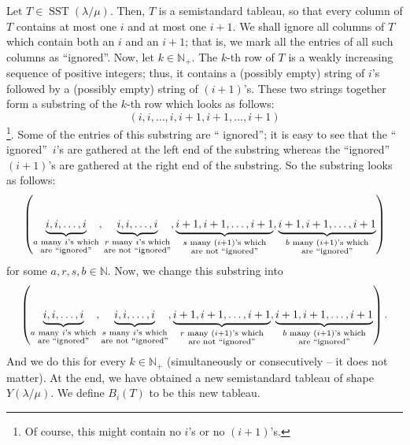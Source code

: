\documentclass[numbers=enddot,12pt,final,onecolumn,notitlepage]{scrartcl}%
\theoremstyle{definition}
\begin{document}
Let $T\in\operatorname*{SST}\left(  \lambda/\mu\right)  $. Then, $T$ is a
semistandard tableau, so that every column of $T$ contains at most one $i$ and
at most one $i+1$. We shall ignore all columns of $T$ which contain both an
$i$ and an $i+1$; that is, we mark all the entries of all such columns as
\textquotedblleft ignored\textquotedblright. Now, let $k\in\mathbb{N}_{+}$.
The $k$-th row of $T$ is a weakly increasing sequence of positive integers;
thus, it contains a (possibly empty) string of $i$'s followed by a (possibly
empty) string of $\left(  i+1\right)  $'s. These two strings together form a
substring of the $k$-th row which looks as follows:%
\[
\left(  i,i,\ldots,i,i+1,i+1,\ldots,i+1\right)
\]
\footnote{Of course, this might contain no $i$'s or no $\left(  i+1\right)
$'s.}. Some of the entries of this substring are \textquotedblleft
ignored\textquotedblright; it is easy to see that the \textquotedblleft
ignored\textquotedblright\ $i$'s are gathered at the left end of the substring
whereas the \textquotedblleft ignored\textquotedblright\ $\left(  i+1\right)
$'s are gathered at the right end of the substring. So the substring looks
as follows:
\[
\left(  \underbrace{i,i,\ldots,i}_{\substack{a\text{ many }i\text{'s
which}\\\text{are \textquotedblleft ignored\textquotedblright}}%
},\underbrace{i,i,\ldots,i}_{\substack{r\text{ many }i\text{'s which}%
\\\text{are not \textquotedblleft ignored\textquotedblright}}%
},\underbrace{i+1,i+1,\ldots,i+1}_{\substack{s\text{ many }\left(  i+1\right)
\text{'s which}\\\text{are not \textquotedblleft ignored\textquotedblright}%
}},\underbrace{i+1,i+1,\ldots,i+1}_{\substack{b\text{ many }\left(
i+1\right)  \text{'s which}\\\text{are \textquotedblleft
ignored\textquotedblright}}}\right)
\]
for some $a,r,s,b\in\mathbb{N}$. Now, we change this substring into%
\[
\left(  \underbrace{i,i,\ldots,i}_{\substack{a\text{ many }i\text{'s
which}\\\text{are \textquotedblleft ignored\textquotedblright}}%
},\underbrace{i,i,\ldots,i}_{\substack{s\text{ many }i\text{'s which}%
\\\text{are not \textquotedblleft ignored\textquotedblright}}%
},\underbrace{i+1,i+1,\ldots,i+1}_{\substack{r\text{ many }\left(  i+1\right)
\text{'s which}\\\text{are not \textquotedblleft ignored\textquotedblright}%
}},\underbrace{i+1,i+1,\ldots,i+1}_{\substack{b\text{ many }\left(
i+1\right)  \text{'s which}\\\text{are \textquotedblleft
ignored\textquotedblright}}}\right)  .
\]
And we do this for every $k\in\mathbb{N}_{+}$ (simultaneously or consecutively
-- it does not matter). At the end, we have obtained a new semistandard
tableau of shape $Y\left(  \lambda/\mu\right)  $. We define $B_{i}\left(
T\right)  $ to be this new tableau.
\end{document}
